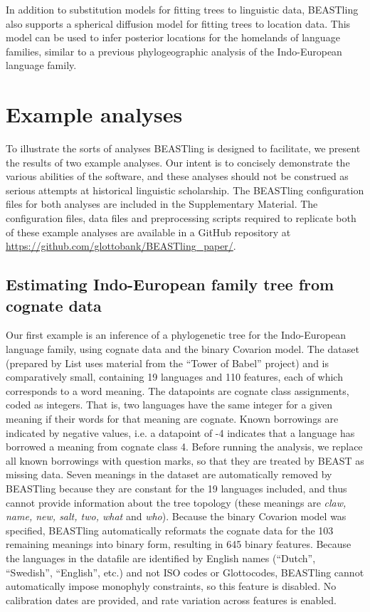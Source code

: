 \documentclass[10pt,a4paper]{article}
\begin{document}
In addition to substitution models for fitting trees to linguistic data, BEASTling also supports a spherical diffusion model\cite{Bouckaert2016} for fitting trees to location data.  This model can be used to infer posterior locations for the homelands of language families, similar to a previous phylogeographic analysis of the Indo-European language family\cite{Bouckaert2012}.

\section{Example analyses}

To illustrate the sorts of analyses BEASTling is designed to facilitate, we present the results of two example analyses.  Our intent is to concisely demonstrate the various abilities of the software, and these analyses should not be construed as serious attempts at historical linguistic scholarship.  The BEASTling configuration files for both analyses are included in the Supplementary Material.  The configuration files, data files and preprocessing scripts required to replicate both of these example analyses are available in a GitHub repository at \url{https://github.com/glottobank/BEASTling_paper/}.

\subsection{Estimating Indo-European family tree from cognate data}

Our first example is an inference of a phylogenetic tree for the Indo-European language family, using cognate data and the binary Covarion model.  The dataset\cite{List2014a} (prepared by List\cite{List2014} uses material from the ``Tower of Babel'' project\cite{Starostin2008}) and is comparatively small, containing 19 languages and 110 features, each of which corresponds to a word meaning.  The datapoints are cognate class assignments, coded as integers.  That is, two languages have the same integer for a given meaning if their words for that meaning are cognate.  Known borrowings are indicated by negative values, i.e. a datapoint of -4 indicates that a language has borrowed a meaning from cognate class 4.  Before running the analysis, we replace all known borrowings with question marks, so that they are treated by BEAST as missing data.  Seven meanings in the dataset are automatically removed by BEASTling because they are constant for the 19 languages included, and thus cannot provide information about the tree topology (these meanings are \emph{claw, name, new, salt, two, what} and \emph{who}).  Because the binary Covarion model was specified, BEASTling automatically reformats the cognate data for the 103 remaining meanings into binary form, resulting in 645 binary features.  Because the languages in the datafile are identified by English names (``Dutch'', ``Swedish'', ``English'', etc.) and not ISO codes or Glottocodes, BEASTling cannot automatically impose monophyly constraints, so this feature is disabled.  No calibration dates are provided, and rate variation across features is enabled.
\end{document}
